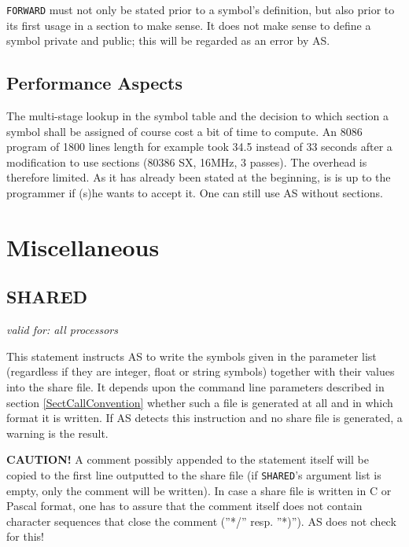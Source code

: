 \documentclass[12pt,twoside]{report}
\makeatletter
\newcommand{\bb}[1]{{\bf #1}}
\newcommand{\tty}[1]{{\tt #1}}
\newcommand{\ttindex}[1]{\index{#1@{\tt #1}}}
\makeatother
\begin{document}
\tty{FORWARD} must not only be stated prior to a symbol's definition, but
also prior to its first usage in a section to make sense.  It does not
make sense to define a symbol private and public; this will be regarded as
an error by AS.


\subsection{Performance Aspects}

The multi-stage lookup in the symbol table and the decision to which
section a symbol shall be assigned of course cost a bit of time to
compute.  An 8086 program of 1800 lines length for example took 34.5
instead of 33 seconds after a modification to use sections (80386 SX,
16MHz, 3 passes).  The overhead is therefore limited.  As it has
already been stated at the beginning, is is up to the programmer if
(s)he wants to accept it.  One can still use AS without sections.


\section{Miscellaneous}


\subsection{SHARED}
\label{ChapShareOrder}
\ttindex{SHARED}

{\em valid for: all processors}

This statement instructs AS to write the symbols given in the
parameter list (regardless if they are integer, float or string
symbols) together with their values into the share file.  It depends
upon the command line parameters described in section
\ref{SectCallConvention} whether such a file is generated at all and in
which format it is written.  If AS detects this instruction and no share
file is generated, a warning is the result.

\bb{CAUTION!}  A comment possibly appended to the statement itself will be
copied to the first line outputted to the share file (if \tty{SHARED}'s
argument list is empty, only the comment will be written).  In case a
share file is written in C or Pascal format, one has to assure that
the comment itself does not contain character sequences that close
the comment (''*/'' resp. ''*)'').  AS does not check for this!
\end{document}
